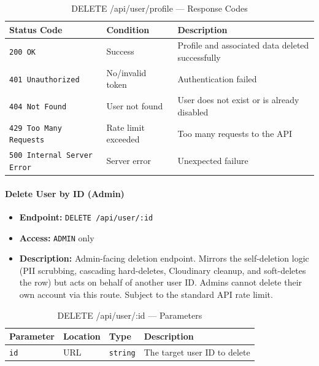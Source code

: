 \begin{table}[H]
\centering
\renewcommand{\arraystretch}{1.3}
\begin{tabularx}{\textwidth}{|l|l|X|}
\hline
\textbf{Status Code} & \textbf{Condition} & \textbf{Description} \\
\hline
\texttt{200 OK}           & Success              & Profile and associated data deleted successfully \\
\hline
\texttt{401 Unauthorized} & No/invalid token     & Authentication failed \\
\hline
\texttt{404 Not Found}    & User not found       & User does not exist or is already disabled \\
\hline
\texttt{429 Too Many Requests} & Rate limit exceeded & Too many requests to the API \\
\hline
\texttt{500 Internal Server Error} & Server error & Unexpected failure \\
\hline
\end{tabularx}
\caption{DELETE /api/user/profile — Response Codes}
\label{tab:delete-my-profile-responses}
\end{table}
\FloatBarrier

\paragraph{Delete User by ID (Admin)}
\label{subsubsec:delete-user-by-id}

\begin{itemize}
  \item \textbf{Endpoint:} \texttt{DELETE /api/user/:id}
  \item \textbf{Access:} \texttt{ADMIN} only
  \item \textbf{Description:} Admin-facing deletion endpoint. Mirrors the self-deletion logic (PII scrubbing, cascading hard-deletes, Cloudinary cleanup, and soft-deletes the row) but acts on behalf of another user ID. Admins cannot delete their own account via this route. Subject to the standard API rate limit.
\end{itemize}

\begin{table}[H]
\centering
\renewcommand{\arraystretch}{1.3}
\begin{tabularx}{\textwidth}{|l|l|l|X|}
\hline
\textbf{Parameter} & \textbf{Location} & \textbf{Type} & \textbf{Description} \\
\hline
\texttt{id} & URL & \texttt{string} & The target user ID to delete \\
\hline
\end{tabularx}
\caption{DELETE /api/user/:id — Parameters}
\label{tab:delete-user-by-id-params}
\end{table}

